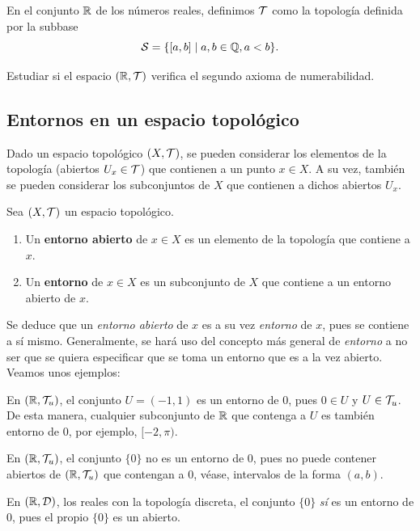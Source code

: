 \begin{ex}
    \hypertarget{2026 S 3}{}
    En el conjunto \(\mathbb{R}\) de los números reales, definimos \(\mathcal{T}\) como la topología definida por la subbase \[\mathcal{S} = \{[a,b] \mid a, b \in \mathbb{Q}, a < b\}.\]

    Estudiar si el espacio \((\mathbb{R}, \mathcal{T})\) verifica el segundo axioma de numerabilidad.
\end{ex}


\subsection*{Entornos en un espacio topológico}

\hypertarget{sec:entornos}{}
Dado un espacio topológico $(X,\mathcal{T})$, se pueden considerar los elementos de la topología (abiertos $U_x\in\mathcal{T}$) que contienen a un punto $x\in X$. A su vez, también se pueden considerar los subconjuntos de $X$ que contienen a dichos abiertos $U_x$.

\begin{deff}
    Sea $(X,\mathcal{T})$ un espacio topológico.
    \begin{enumerate}[label=--,itemsep=0pt, leftmargin=15pt]
        \item Un {\bf entorno abierto} de $x\in X$ es un elemento de la topología que contiene a $x$.
        \item Un {\bf entorno} de $x\in X$ es un subconjunto de $X$ que contiene a un entorno abierto de $x$.
    \end{enumerate}
\end{deff}

Se deduce que un {\it entorno abierto} de $x$ es a su vez {\it entorno} de $x$, pues se contiene a sí mismo. Generalmente, se hará uso del concepto más general de {\it entorno} a no ser que se quiera especificar que se toma un entorno que es a la vez abierto. Veamos unos ejemplos:

\begin{ejs}
    \item En $(\mathbb{R},\mathcal{T}_u)$, el conjunto $U = (-1,1)$ es un entorno de $0$, pues $0\in U$ y $U\in\mathcal{T}_u$. De esta manera, cualquier subconjunto de $\mathbb{R}$ que contenga a $U$ es también entorno de $0$, por ejemplo, $[-2,\pi)$.
    \item En $(\mathbb{R},\mathcal{T}_u)$, el conjunto $\{0\}$ no es un entorno de $0$, pues no puede contener abiertos de $(\mathbb{R},\mathcal{T}_u)$ que contengan a $0$, véase, intervalos de la forma $(a,b)$.
    \item En $(\mathbb{R}, \mathcal{D})$, los reales con la topología discreta, el conjunto $\{0\}$ {\it sí} es un entorno de $0$, pues el propio $\{0\}$ es un abierto.
\end{ejs}

